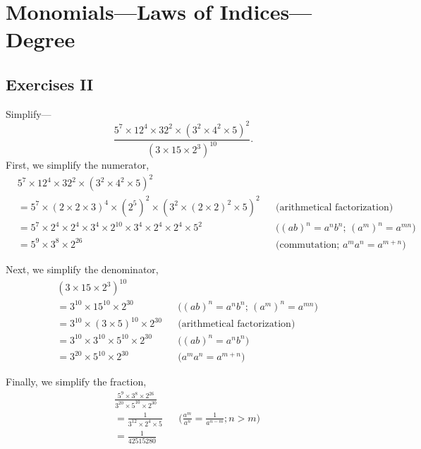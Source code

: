 \documentclass[DIN, pagenumber=false, fontsize=11pt, parskip=half]{scrartcl}
\title{}
\author{} %
\date{}
\begin{document}
\maketitle

\setcounter{section}{1}
\section{Monomials---Laws of Indices---Degree}

\subsection{Exercises II}

\begin{problems}[from=1,step=1]
    \problem Simplify---
    \[
        \frac{5^7 \times 12^4 \times 32^2 \times (3^2 \times 4^2 \times 5)^2}{(3 \times 15 \times 2^3)^{10}}.
    \]
    \answer
    First, we simplify the numerator,
    \begin{align*}
        &5^7 \times 12^4 \times 32^2 \times (3^2 \times 4^2 \times 5)^2 \\ 
        &= 5^7 \times (2\times2\times3)^4 \times (2^5)^2 \times (3^2 \times (2\times2)^2 \times 5)^2 && \text{(arithmetical factorization)}\\ 
        &= 5^7 \times 2^4 \times 2^4 \times 3^4 \times 2^{10} \times 3^4 \times 2^4 \times 2^4 \times 5^2 && \text{($(ab)^n = a^nb^n$; $(a^m)^n = a^{mn}$)}\\ 
        &= 5^9 \times 3^8 \times 2^{26} && \text{(commutation; $a^ma^n = a^{m+n}$)}
    \end{align*}

    Next, we simplify the denominator,
    \begin{align*}
        &(3 \times 15 \times 2^3)^{10} \\ 
        &= 3^{10} \times 15^{10} \times 2^{30} && \text{($(ab)^n = a^nb^n$; $(a^m)^n = a^{mn}$)}\\ 
        &= 3^{10} \times (3\times5)^{10} \times 2^{30} && \text{(arithmetical factorization)}\\ 
        &= 3^{10} \times 3^{10} \times 5^{10} \times 2^{30} && \text{($(ab)^n = a^nb^n$)}\\ 
        &= 3^{20} \times 5^{10} \times 2^{30} && \text{($a^ma^n = a^{m+n}$)}
    \end{align*}

    Finally, we simplify the fraction,
    \begin{align*}
        &\frac{5^9 \times 3^8 \times 2^{26}}{3^{20} \times 5^{10} \times 2^{30}} \\ 
        &= \frac{1}{3^{12} \times 2^4 \times 5} && \text{($\tfrac{a^m}{a^n} = \tfrac{1}{a^{n-m}}; n>m$)}\\ 
        &= \frac{1}{42515280}
    \end{align*}


\end{problems}
\end{document}
